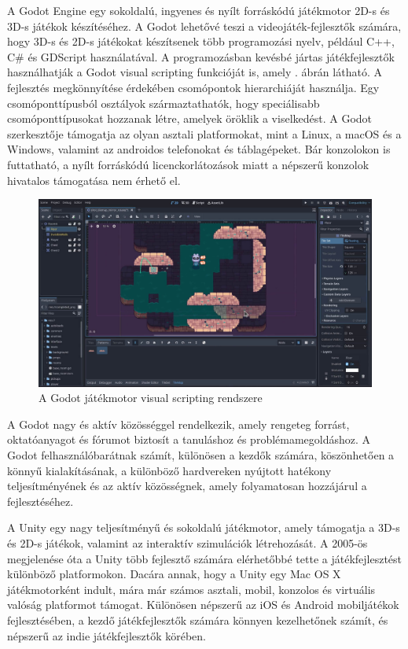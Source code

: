 A Godot Engine egy sokoldalú, ingyenes és nyílt forráskódú játékmotor 2D-s és 3D-s játékok készítéséhez. A Godot lehetővé teszi a videojáték-fejlesztők számára, hogy 3D-s és 2D-s játékokat készítsenek több programozási nyelv, például C++, C\# és GDScript használatával. A programozásban kevésbé jártas játékfejlesztők használhatják a Godot visual scripting funkcióját is, amely . ábrán látható. A fejlesztés megkönnyítése érdekében csomópontok hierarchiáját használja. Egy csomóponttípusból osztályok származtathatók, hogy speciálisabb csomóponttípusokat hozzanak létre, amelyek öröklik a viselkedést. A Godot szerkesztője támogatja az olyan asztali platformokat, mint a Linux, a macOS és a Windows, valamint az androidos telefonokat és táblagépeket. Bár konzolokon is futtatható, a nyílt forráskódú licenckorlátozások miatt a népszerű konzolok hivatalos támogatása nem érhető el. \cite{godot}

\begin{figure}[ht]
\centering
\includegraphics[scale = 0.2]{images/Godot_engine.jpg}
\caption{A Godot játékmotor visual scripting rendszere \cite{godot}}
\label{fig:godotengine}
\end{figure}

A Godot nagy és aktív közösséggel rendelkezik, amely rengeteg forrást, oktatóanyagot és fórumot biztosít a tanuláshoz és problémamegoldáshoz. A Godot felhasználóbarátnak számít, különösen a kezdők számára, köszönhetően a könnyű kialakításának, a különböző hardvereken nyújtott hatékony teljesítményének és az aktív közösségnek, amely folyamatosan hozzájárul a fejlesztéséhez.


A Unity egy nagy teljesítményű és sokoldalú játékmotor, amely támogatja a 3D-s és 2D-s játékok, valamint az interaktív szimulációk létrehozását. A 2005-ös megjelenése óta a Unity több fejlesztő számára elérhetőbbé tette a játékfejlesztést különböző platformokon. Dacára annak, hogy a Unity egy Mac OS X játékmotorként indult, mára már számos asztali, mobil, konzolos és virtuális valóság platformot támogat. Különösen népszerű az iOS és Android mobiljátékok fejlesztésében, a kezdő játékfejlesztők számára könnyen kezelhetőnek számít, és népszerű az indie játékfejlesztők körében.

